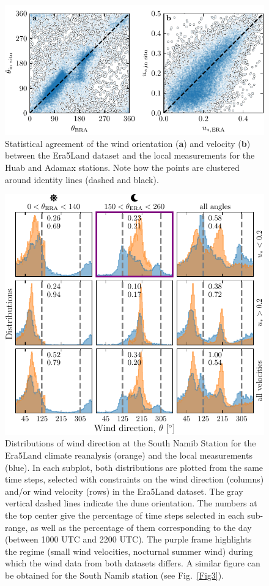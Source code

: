 \begin{figure}
  \centering
  \includegraphics[scale=1]{Figures/Figure5_supp.pdf}
  \caption{Statistical agreement of the wind orientation (\textbf{a}) and velocity (\textbf{b}) between the Era5Land dataset and the local measurements for the Huab and Adamax stations. Note how the points are clustered around identity lines (dashed and black).}
  \label{Fig5_supp}
\end{figure}

\begin{figure}
  \centering
  \includegraphics[scale=1]{Figures/Figure6_supp.pdf}
  \caption{Distributions of wind direction at the South Namib Station for the Era5Land climate reanalysis (orange) and the local measurements (blue). In each subplot, both distributions are plotted from the same time steps, selected with constraints on the wind direction (columns) and/or wind velocity (rows) in the Era5Land dataset. The gray vertical dashed lines indicate the dune orientation. The numbers at the top center give the percentage of time steps selected in each sub-range, as well as the percentage of them corresponding to the day (between 1000 UTC and 2200 UTC). The purple frame highlights the regime (small wind velocities, nocturnal summer wind) during which the wind data from both datasets differs. A similar figure can be obtained for the South Namib station (see Fig.~\ref{Fig3}).}
  \label{Fig6_supp}
\end{figure}

